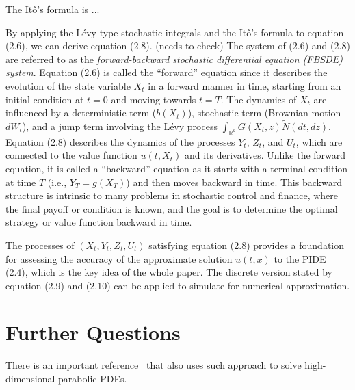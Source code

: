 \documentclass[12pt,letterpaper,oneside]{article}
\begin{document}
	 The It\^o's formula is ...
	 
	 By applying the L\'evy type stochastic integrals and the It\^o's formula to equation (2.6), we can derive equation (2.8). (needs to check)  The system of (2.6) and (2.8) are referred to as the \textit{forward-backward stochastic differential equation (FBSDE) system}. Equation (2.6) is called the ``forward'' equation since it describes the evolution of the state variable \( X_t \) in a forward manner in time, starting from an initial condition at \( t = 0 \) and moving towards \( t = T \). The dynamics of \( X_t \) are influenced by a deterministic term (\( b(X_t) \)), stochastic term (Brownian motion \( dW_t \)), and a jump term involving the Lévy process \( \int_{\mathbb{R}^d} G(X_t, z) \tilde{N}(dt, dz) \). Equation (2.8) describes the dynamics of the processes \( Y_t \), \( Z_t \), and \( U_t \), which are connected to the value function \( u(t, X_t) \) and its derivatives. Unlike the forward equation, it is called a ``backward'' equation as it starts with a terminal condition at time \( T \) (i.e., \( Y_T = g(X_T) \)) and then moves backward in time. This backward structure is intrinsic to many problems in stochastic control and finance, where the final payoff or condition is known, and the goal is to determine the optimal strategy or value function backward in time.
	 
	 The processes of $ (X_t, Y_t, Z_t, U_t) $ satisfying equation (2.8) provides a foundation for assessing the accuracy of the approximate solution $ u(t,x) $ to the PIDE (2.4), which is the key idea of the whole paper. The discrete version stated by equation (2.9) and (2.10) can be applied to simulate for numerical approximation.
	 
\section{Further Questions}
	There is an important reference~\cite{Zeng2022} that also uses such approach to solve high-dimensional parabolic PDEs.




\end{document}
